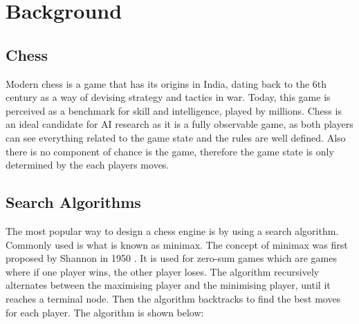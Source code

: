 \chapter{Background}
\section{Chess}
Modern chess is a game that has its origins in India, dating back to the 6th century 
as a way of devising strategy and tactics in war. Today, this game is perceived as a benchmark for skill and intelligence, played by millions. Chess is an ideal candidate for AI research as it is a fully observable game, as both players can see everything related to the game state and the rules are well defined. Also there is no component of chance is the game, therefore the game state is only determined by the each players moves.


\section{Search Algorithms}
The most popular way to design a chess engine is by using a search algorithm. Commonly used is what is known as minimax. The concept of minimax was first proposed by Shannon in 1950 \cite{shannonXXIIProgrammingComputer1950}.
It is used for zero-sum games which are games where if one player wins, the other player loses. The algorithm recursively alternates between the maximising player and the minimising player, until it reaches a terminal node. Then the algorithm backtracks to find the best moves for each player. The algorithm is shown below:


